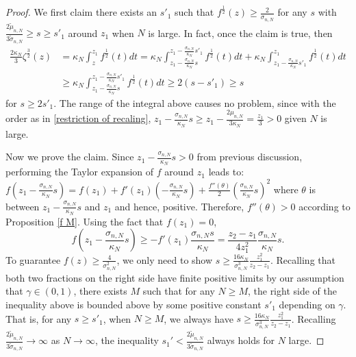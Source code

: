 \documentclass[11pt]{article}
\numberwithin{equation}{section}%
\numberwithin{theorem}{section}
\begin{document}
  \begin{proof} We first claim there exists an $s'_1$ such that $f^{\frac{1}{2}}(z)\ge\frac{2}{\sigma_{n,N}}$ for any $s$ with $\frac{2\tilde{\mu}_{n,N}}{3\tilde{\sigma}_{n,N}}\ge s\ge s'_1$ around $z_1$ when $N$ is large. In fact, once the claim is true, then
  \begin{equation*}
  \begin{split}
      \frac{2\kappa_N}{3}\zeta^{\frac{3}{2}}(z)&=\kappa_N\int_{z}^{z_1}f^{\frac{1}{2}}(t)dt=\kappa_N\int_{z_1-\frac{\sigma_{n,N}}{\kappa_N}s}^{z_1-\frac{\sigma_{n,N}}{\kappa_N}s'_1}f^{\frac{1}{2}}(t)dt+\kappa_N\int_{z_1-\frac{\sigma_{n,N}}{\kappa_N}s'_1}^{z_1}f^{\frac{1}{2}}(t)dt\\
      &\ge\kappa_N\int_{z_1-\frac{\sigma_{n,N}}{\kappa_N}s}^{z_1-\frac{\sigma_{n,N}}{\kappa_N}s'_1}f^{\frac{1}{2}}(t)dt\ge2(s-s'_1)\ge s
      \end{split}
  \end{equation*}
for $s\ge2s'_1$. The range of the integral above causes no problem, since with the order as in \eqref{restriction of recaling}, $z_1-\frac{\sigma_{n,N}}{\kappa_N}s\ge z_1-\frac{2\mu_{n,N}}{3\kappa_N}=\frac{z_1}{3}>0$ given $N$ is large.

Now we prove the claim. Since $z_1-\frac{\sigma_{n,N}}{\kappa_N}s>0$ from previous discussion, performing the Taylor expansion of $f$ around $z_1$ leads to: $f(z_1-\frac{\sigma_{n,N}}{\kappa_N}s)=f(z_1)+f'(z_1)(-\frac{\sigma_{n,N}}{\kappa_N}s)+\frac{f''(\theta)}{2}(\frac{\sigma_{n,N}}{\kappa_N}s)^2$ where $\theta$ is between $z_1-\frac{\sigma_{n,N}}{\kappa_N}s$ and $z_1$ and hence, positive. Therefore, $f''(\theta)>0$ according to Proposition \ref{f M}.
Using the fact that $f(z_1)=0$,
\begin{equation*}
    f\left(z_1-\frac{\sigma_{n,N}}{\kappa_N}s\right)\ge-f'(z_1)\frac{\sigma_{n,N}s}{\kappa_N}=\frac{z_2-z_1}{4z_1^2}\frac{\sigma_{n,N}}{\kappa_N}s.
\end{equation*}
To guarantee $f(z)\ge\frac{4}{\sigma^2_{n,N}}$, we only need to show $s\ge\frac{16\kappa_N}{\sigma^3_{n,N}}\frac{z_1^2}{z_2-z_1}$. Recalling that both two fractions on the right side have finite positive limits by our assumption that $\gamma\in(0,1)$, there exists $M$ such that for any $N\ge M$, the right side of the inequality above is bounded above by some positive constant $s'_1$ depending on $\gamma$. That is, for any $s\ge s'_1$, when $N\ge M$, we always have $s\ge\frac{16\kappa_N}{\sigma_{n,N}^3}\frac{z_1^2}{z_2-z_1}$. Recalling $\frac{2\tilde{\mu}_{n,N}}{3\tilde{\sigma}_{n,N}}\rightarrow\infty$ as $N\rightarrow\infty$, the inequality $s_1'<\frac{2\tilde{\mu}_{n,N}}{3\tilde{\sigma}_{n,N}}$ always holds for $N$ large.


\end{proof}
\end{document}
